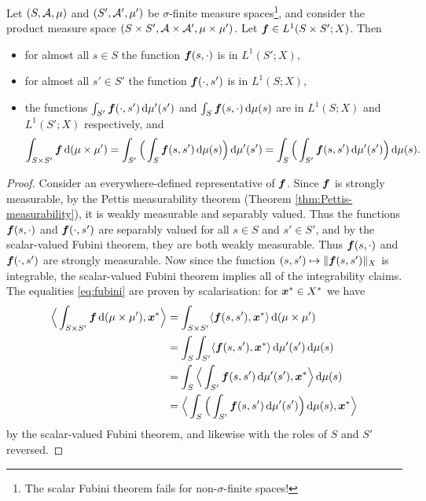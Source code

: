 \begin{prop}[Fubini]
  Let $(S,\mathcal{A},\mu)$ and $(S',\mathcal{A}',\mu')$ be $\sigma$-finite measure spaces\footnote{The scalar Fubini theorem fails for non-$\sigma$-finite spaces!}, and consider the product measure space $(S \times S', \mathcal{A} \times \mathcal{A}', \mu \times \mu')$.
  Let $\bm{f} \in L^1(S \times S'; X)$.
  Then
  \begin{itemize}
  \item for almost all $s \in S$ the function $\bm{f}(s,\cdot)$ is in $L^1(S';X)$,
  \item for almost all $s' \in S'$ the function $\bm{f}(\cdot,s')$ is in $L^1(S;X)$,
  \item the functions $\int_{S'} \bm{f}(\cdot,s') \, \mathrm{d}\mu'(s')$ and $\int_{S} \bm{f}(s,\cdot) \, \mathrm{d}\mu(s)$ are in $L^1(S;X)$ and $L^1(S';X)$ respectively, and
    \begin{equation}\label{eq:fubini}
      \int_{S \times S'} \bm{f} \, \mathrm{d}(\mu \times \mu') = \int_{S'} \Big(  \int_S \bm{f}(s,s') \, \mathrm{d}\mu(s) \Big) \, \mathrm{d}\mu'(s') = \int_S \Big(\int_{S'} \bm{f}(s,s') \, \mathrm{d}\mu'(s') \Big) \, \mathrm{d}\mu(s).
    \end{equation}
  \end{itemize}
\end{prop}

\begin{proof}
  Consider an everywhere-defined representative of $\bm{f}$.
  Since $\bm{f}$ is strongly measurable, by the Pettis measurability theorem (Theorem \ref{thm:Pettis-measurability}), it is weakly measurable and separably valued.
  Thus the functions $\bm{f}(s,\cdot)$ and $\bm{f}(\cdot,s')$ are separably valued for all $s \in S$ and $s' \in S'$, and by the scalar-valued Fubini theorem, they are both weakly measurable.
  Thus $\bm{f}(s,\cdot)$ and $\bm{f}(\cdot,s')$ are strongly measurable.
  Now since the function $(s,s') \mapsto \|\bm{f}(s,s')\|_X$ is integrable, the scalar-valued Fubini theorem implies all of the integrability claims.
  The equalities \eqref{eq:fubini} are proven by scalarisation: for $\bm{x}^* \in X^*$ we have
  \begin{equation*}
    \begin{aligned}
      \Big\langle \int_{S \times S'} \bm{f} \, \mathrm{d}(\mu \times \mu') , \bm{x}^* \Big\rangle
      &= \int_{S \times S'} \langle \bm{f}(s,s'), \bm{x}^* \rangle \, \mathrm{d}(\mu \times \mu') \\
      &= \int_{S} \int_{S'} \langle \bm{f}(s,s'), \bm{x}^* \rangle \, \mathrm{d}\mu'(s') \, \mathrm{d}\mu(s) \\
      &= \int_{S} \Big\langle \int_{S'} \bm{f}(s,s') \, \mathrm{d}\mu'(s') , \bm{x}^* \Big\rangle \, \mathrm{d}\mu(s) \\
      &= \Big\langle \int_S \Big(\int_{S'} \bm{f}(s,s') \, \mathrm{d}\mu'(s') \Big)\, \mathrm{d}\mu(s) , \bm{x}^* \Big\rangle
  \end{aligned}
  \end{equation*}
  by the scalar-valued Fubini theorem, and likewise with the roles of $S$ and $S'$ reversed.
\end{proof}

